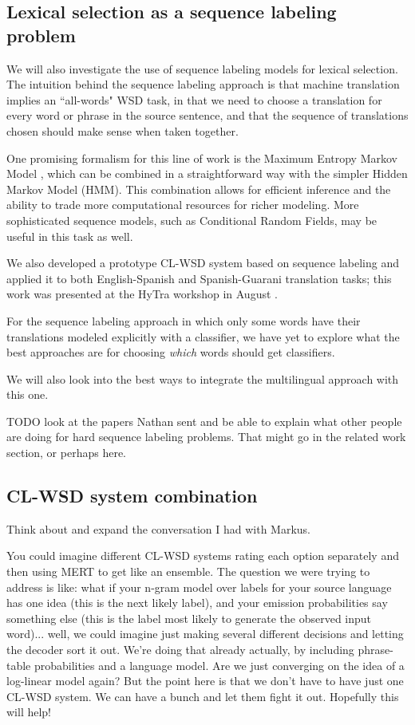 \subsection{Lexical selection as a sequence labeling problem}
We will also investigate the use of sequence labeling models for lexical
selection.  The intuition behind the sequence labeling approach is that machine
translation implies an ``all-words" WSD task, in that we need to choose a
translation for every word or phrase in the source sentence, and that the
sequence of translations chosen should make sense when taken together.


One promising formalism for this line of work is the Maximum Entropy Markov
Model \cite{icml00/mccallum}, which can be combined in a straightforward way
with the simpler Hidden Markov Model (HMM).
This combination allows for efficient inference and the ability to trade more
computational resources for richer modeling. More sophisticated sequence
models, such as Conditional Random Fields, may be useful in this task as well.

We also developed a prototype CL-WSD system based on sequence labeling and
applied it to both English-Spanish and Spanish-Guarani translation tasks; this
work was presented at the HyTra workshop in August
\cite{rudnick-gasser:2013:HyTra-2013}.

For the sequence labeling approach in which only some words have their
translations modeled explicitly with a classifier, we have yet to explore what
the best approaches are for choosing \emph{which} words should get classifiers.

We will also look into the best ways to integrate the multilingual approach
with this one.

TODO look at the papers Nathan sent and be able to explain what other people
are doing for hard sequence labeling problems. That might go in the related
work section, or perhaps here.

\subsection{CL-WSD system combination}

Think about and expand the conversation I had with Markus.

You could imagine different CL-WSD systems rating each option separately and
then using MERT to get like an ensemble.
The question we were trying to address is like:
what if your n-gram model over labels for your source language has one idea
(this is the next likely label), and your emission probabilities say something
else (this is the label most likely to generate the observed input word)...
well, we could imagine just making several different decisions and letting the
decoder sort it out. We're doing that already actually, by including
phrase-table probabilities and a language model.
Are we just converging on the idea of a log-linear model again?
But the point here is that we don't have to have just one CL-WSD system. We can
have a bunch and let them fight it out. Hopefully this will help!

